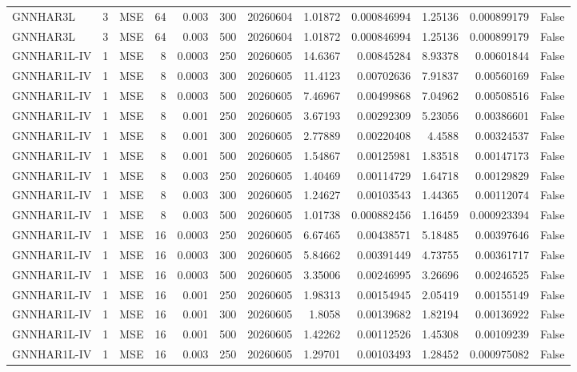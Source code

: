 \begin{tabular}{lrlrrrrrrrrr}
GNNHAR3L & 3 & MSE & 64 & 0.003 & 300 & 20260604 & 1.01872 & 0.000846994 & 1.25136 & 0.000899179 & False \\
GNNHAR3L & 3 & MSE & 64 & 0.003 & 500 & 20260604 & 1.01872 & 0.000846994 & 1.25136 & 0.000899179 & False \\
GNNHAR1L-IV & 1 & MSE & 8 & 0.0003 & 250 & 20260605 & 14.6367 & 0.00845284 & 8.93378 & 0.00601844 & False \\
GNNHAR1L-IV & 1 & MSE & 8 & 0.0003 & 300 & 20260605 & 11.4123 & 0.00702636 & 7.91837 & 0.00560169 & False \\
GNNHAR1L-IV & 1 & MSE & 8 & 0.0003 & 500 & 20260605 & 7.46967 & 0.00499868 & 7.04962 & 0.00508516 & False \\
GNNHAR1L-IV & 1 & MSE & 8 & 0.001 & 250 & 20260605 & 3.67193 & 0.00292309 & 5.23056 & 0.00386601 & False \\
GNNHAR1L-IV & 1 & MSE & 8 & 0.001 & 300 & 20260605 & 2.77889 & 0.00220408 & 4.4588 & 0.00324537 & False \\
GNNHAR1L-IV & 1 & MSE & 8 & 0.001 & 500 & 20260605 & 1.54867 & 0.00125981 & 1.83518 & 0.00147173 & False \\
GNNHAR1L-IV & 1 & MSE & 8 & 0.003 & 250 & 20260605 & 1.40469 & 0.00114729 & 1.64718 & 0.00129829 & False \\
GNNHAR1L-IV & 1 & MSE & 8 & 0.003 & 300 & 20260605 & 1.24627 & 0.00103543 & 1.44365 & 0.00112074 & False \\
GNNHAR1L-IV & 1 & MSE & 8 & 0.003 & 500 & 20260605 & 1.01738 & 0.000882456 & 1.16459 & 0.000923394 & False \\
GNNHAR1L-IV & 1 & MSE & 16 & 0.0003 & 250 & 20260605 & 6.67465 & 0.00438571 & 5.18485 & 0.00397646 & False \\
GNNHAR1L-IV & 1 & MSE & 16 & 0.0003 & 300 & 20260605 & 5.84662 & 0.00391449 & 4.73755 & 0.00361717 & False \\
GNNHAR1L-IV & 1 & MSE & 16 & 0.0003 & 500 & 20260605 & 3.35006 & 0.00246995 & 3.26696 & 0.00246525 & False \\
GNNHAR1L-IV & 1 & MSE & 16 & 0.001 & 250 & 20260605 & 1.98313 & 0.00154945 & 2.05419 & 0.00155149 & False \\
GNNHAR1L-IV & 1 & MSE & 16 & 0.001 & 300 & 20260605 & 1.8058 & 0.00139682 & 1.82194 & 0.00136922 & False \\
GNNHAR1L-IV & 1 & MSE & 16 & 0.001 & 500 & 20260605 & 1.42262 & 0.00112526 & 1.45308 & 0.00109239 & False \\
GNNHAR1L-IV & 1 & MSE & 16 & 0.003 & 250 & 20260605 & 1.29701 & 0.00103493 & 1.28452 & 0.000975082 & False \\

\end{tabular}
